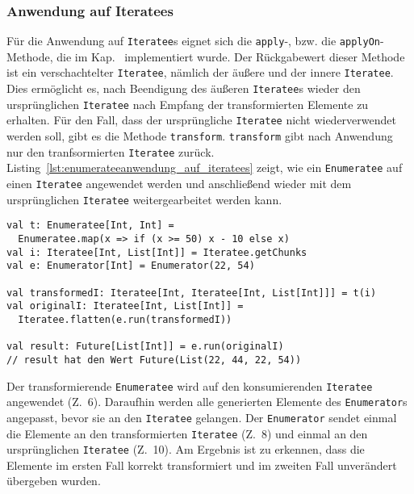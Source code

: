 

\subsubsection{Anwendung auf Iteratees} %
\label{ssub:enumerateeanwendung_auf_iteratees}

Für die Anwendung auf \lstinline|Iteratee|s eignet sich die \lstinline|apply|-, bzw. die \lstinline|applyOn|-Methode, die im Kap.~ implementiert wurde.
Der Rückgabewert dieser Methode ist ein verschachtelter \lstinline|Iteratee|, nämlich der äußere und der innere \lstinline|Iteratee|.
Dies ermöglicht es, nach Beendigung des äußeren \lstinline|Iteratee|s wieder den ursprünglichen \lstinline|Iteratee| nach Empfang der transformierten Elemente zu erhalten.
Für den Fall, dass der ursprüngliche \lstinline|Iteratee| nicht wiederverwendet werden soll, gibt es die Methode \lstinline|transform|.
\lstinline|transform| gibt nach Anwendung nur den tranfsormierten \lstinline|Iteratee| zurück.
Listing~\ref{lst:enumerateeanwendung_auf_iteratees} zeigt, wie ein \lstinline|Enumeratee| auf einen \lstinline|Iteratee| angewendet werden und anschließend wieder mit dem ursprünglichen \lstinline|Iteratee| weitergearbeitet werden kann.

\begin{lstlisting}[caption=Enumerateeanwendung auf Iteratees, label=lst:enumerateeanwendung_auf_iteratees]
val t: Enumeratee[Int, Int] =
  Enumeratee.map(x => if (x >= 50) x - 10 else x)
val i: Iteratee[Int, List[Int]] = Iteratee.getChunks
val e: Enumerator[Int] = Enumerator(22, 54)

val transformedI: Iteratee[Int, Iteratee[Int, List[Int]]] = t(i)
val originalI: Iteratee[Int, List[Int]] =
  Iteratee.flatten(e.run(transformedI))

val result: Future[List[Int]] = e.run(originalI)
// result hat den Wert Future(List(22, 44, 22, 54))
\end{lstlisting}

Der transformierende \lstinline|Enumeratee| wird auf den konsumierenden \lstinline|Iteratee| angewendet (Z.~6).
Daraufhin werden alle generierten Elemente des \lstinline|Enumerator|s angepasst, bevor sie an den \lstinline|Iteratee| gelangen.
Der \lstinline|Enumerator| sendet einmal die Elemente an den transformierten \lstinline|Iteratee| (Z.~8) und einmal an den ursprünglichen \lstinline|Iteratee| (Z.~10).
Am Ergebnis ist zu erkennen, dass die Elemente im ersten Fall korrekt transformiert und im zweiten Fall unverändert übergeben wurden.

